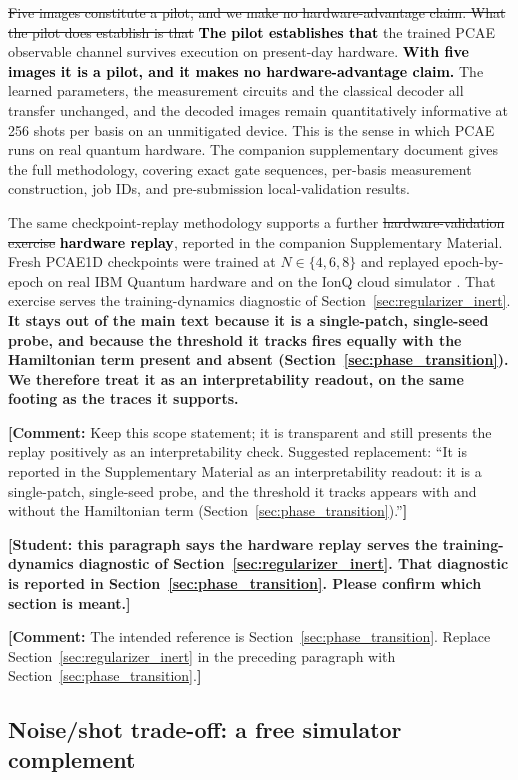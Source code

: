 \documentclass[pdflatex,sn-basic]{sn-jnl}
\newcommand{\del}[1]{\sout{#1}}
\newcommand{\add}[1]{\textbf{\textcolor{black}{#1}}}
\newcommand{\yellowcomment}[1]{%
  \par\smallskip\noindent
  \begingroup\setlength{\fboxsep}{3pt}%
  \colorbox{yellow!35}{\parbox{\dimexpr\linewidth-2\fboxsep\relax}{\textbf{[Comment:} #1\textbf{]}}}%
  \endgroup\par\smallskip}
\begin{document}
\del{Five images constitute a pilot, and we make no hardware-advantage claim. What
the pilot does establish is that} \add{The pilot establishes that} the trained PCAE observable channel survives
execution on present-day hardware. \add{With five images it is a pilot, and it
makes no hardware-advantage claim.} The learned parameters, the measurement
circuits and the classical decoder all transfer unchanged, and the decoded
images remain quantitatively informative at 256 shots per basis on an
unmitigated device. This is the sense in which PCAE runs on real quantum
hardware. The companion supplementary document gives the full methodology,
covering exact gate sequences, per-basis measurement construction, job IDs, and
pre-submission local-validation results.

The same checkpoint-replay methodology supports a further \del{hardware-validation
exercise} \add{hardware replay}, reported in the companion Supplementary Material. Fresh PCAE1D
checkpoints were trained at $N\in\{4,6,8\}$ and replayed epoch-by-epoch on real
IBM Quantum hardware and on the IonQ cloud simulator \citep{IonQBackends}. That
exercise serves the training-dynamics diagnostic of
Section~\ref{sec:regularizer_inert}. {\color{red}\textbf{It stays out of the
main text because it is a single-patch, single-seed probe, and because the
threshold it tracks fires equally with the Hamiltonian term present and absent
(Section~\ref{sec:phase_transition}). We therefore treat it as an
interpretability readout, on the same footing as the traces it supports.}}
\yellowcomment{Keep this scope statement; it is transparent and still presents the replay positively as an interpretability check. Suggested replacement: ``It is reported in the Supplementary Material as an interpretability readout: it is a single-patch, single-seed probe, and the threshold it tracks appears with and without the Hamiltonian term (Section~\ref{sec:phase_transition}).''}

{\color{red}\textbf{[Student: this paragraph says the hardware replay serves the
training-dynamics diagnostic of Section~\ref{sec:regularizer_inert}. That
diagnostic is reported in Section~\ref{sec:phase_transition}. Please confirm
which section is meant.]}}
\yellowcomment{The intended reference is Section~\ref{sec:phase_transition}. Replace Section~\ref{sec:regularizer_inert} in the preceding paragraph with Section~\ref{sec:phase_transition}.}

\color{black}


\subsection{Noise/shot trade-off: a free simulator complement}
\label{sec:hardware_robustness}
\end{document}
